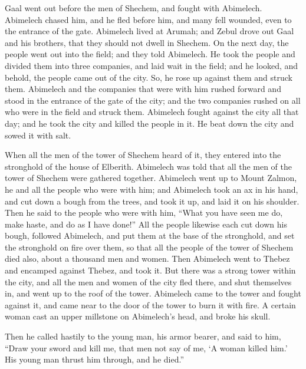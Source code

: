  Gaal went out before the men of Shechem, and fought with
Abimelech.  Abimelech chased him, and he fled before him,
and many fell wounded, even to the entrance of the gate. 
Abimelech lived at Arumah; and Zebul drove out Gaal and his brothers,
that they should not dwell in Shechem.  On the next day,
the people went out into the field; and they told Abimelech.
 He took the people and divided them into three
companies, and laid wait in the field; and he looked, and behold, the
people came out of the city. So, he rose up against them and struck
them.  Abimelech and the companies that were with him
rushed forward and stood in the entrance of the gate of the city; and
the two companies rushed on all who were in the field and struck them.
 Abimelech fought against the city all that day; and he
took the city and killed the people in it. He beat down the city and
sowed it with salt.

 When all the men of the tower of Shechem heard of it,
they entered into the stronghold of the house of Elberith.
 Abimelech was told that all the men of the tower of
Shechem were gathered together.  Abimelech went up to
Mount Zalmon, he and all the people who were with him; and Abimelech
took an ax in his hand, and cut down a bough from the trees, and took it
up, and laid it on his shoulder. Then he said to the people who were
with him, ``What you have seen me do, make haste, and do as I have
done!''  All the people likewise each cut down his bough,
followed Abimelech, and put them at the base of the stronghold, and set
the stronghold on fire over them, so that all the people of the tower of
Shechem died also, about a thousand men and women.  Then
Abimelech went to Thebez and encamped against Thebez, and took it.
 But there was a strong tower within the city, and all
the men and women of the city fled there, and shut themselves in, and
went up to the roof of the tower.  Abimelech came to the
tower and fought against it, and came near to the door of the tower to
burn it with fire.  A certain woman cast an upper
millstone on Abimelech's head, and broke his skull.

 Then he called hastily to the young man, his armor
bearer, and said to him, ``Draw your sword and kill me, that men not say
of me, `A woman killed him.' His young man thrust him through, and he
died.''

